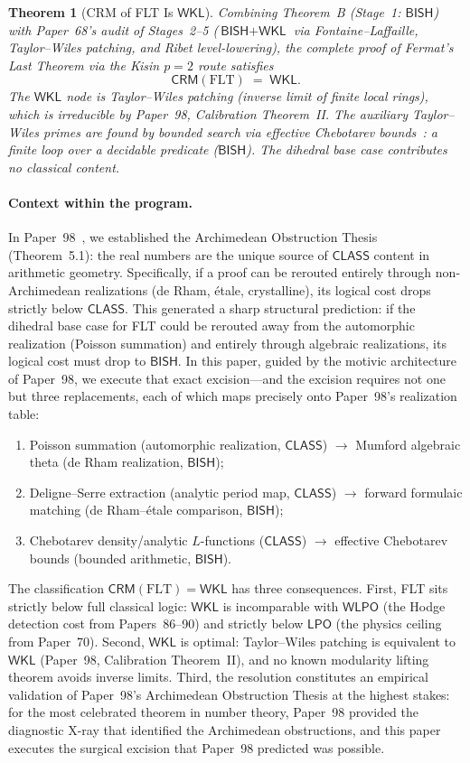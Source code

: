 \documentclass[11pt,a4paper]{article}
\theoremstyle{plain}
\newtheorem{theorem}{Theorem}[section]
\theoremstyle{definition}
\newcommand{\BISH}{\textsf{BISH}}
\newcommand{\WKL}{\textsf{WKL}}
\newcommand{\WLPO}{\textsf{WLPO}}
\newcommand{\LPO}{\textsf{LPO}}
\newcommand{\CLASS}{\textsf{CLASS}}
\newcommand{\CRM}{\textsf{CRM}}
\begin{document}
\begin{theorem}[CRM of FLT Is $\WKL$]\label{thm:C}
Combining Theorem~B (Stage~1: $\BISH$) with Paper~68's audit of Stages~2--5 ($\BISH + \WKL$ via Fontaine--Laffaille, Taylor--Wiles patching, and Ribet level-lowering), the complete proof of Fermat's Last Theorem via the Kisin $p = 2$ route satisfies
\[
\CRM(\mathrm{FLT}) \;=\; \WKL.
\]
The $\WKL$ node is Taylor--Wiles patching (inverse limit of finite local rings), which is irreducible by Paper~98, Calibration Theorem~II.
The auxiliary Taylor--Wiles primes are found by bounded search via effective Chebotarev bounds~\cite{lagarias-odlyzko77}: a finite loop over a decidable predicate ($\BISH$).
The dihedral base case contributes no classical content.
\end{theorem}

\paragraph{Context within the program.}
In Paper~98~\cite{lee-p98}, we established the Archimedean Obstruction Thesis (Theorem~5.1): the real numbers are the unique source of $\CLASS$ content in arithmetic geometry.
Specifically, if a proof can be rerouted entirely through non-Archimedean realizations (de Rham, \'etale, crystalline), its logical cost drops strictly below $\CLASS$.
This generated a sharp structural prediction: if the dihedral base case for FLT could be rerouted away from the automorphic realization (Poisson summation) and entirely through algebraic realizations, its logical cost must drop to $\BISH$.
In this paper, guided by the motivic architecture of Paper~98, we execute that exact excision---and the excision requires not one but three replacements, each of which maps precisely onto Paper~98's realization table:
\begin{enumerate}[label=(\roman*),leftmargin=2em,topsep=3pt]
\item Poisson summation (automorphic realization, $\CLASS$) $\to$ Mumford algebraic theta (de Rham realization, $\BISH$);
\item Deligne--Serre extraction (analytic period map, $\CLASS$) $\to$ forward formulaic matching (de Rham--\'etale comparison, $\BISH$);
\item Chebotarev density/analytic $L$-functions ($\CLASS$) $\to$ effective Chebotarev bounds (bounded arithmetic, $\BISH$).
\end{enumerate}
The classification $\CRM(\mathrm{FLT}) = \WKL$ has three consequences.
First, FLT sits strictly below full classical logic: $\WKL$ is incomparable with $\WLPO$ (the Hodge detection cost from Papers~86--90) and strictly below $\LPO$ (the physics ceiling from Paper~70).
Second, $\WKL$ is optimal: Taylor--Wiles patching is equivalent to $\WKL$ (Paper~98, Calibration Theorem~II), and no known modularity lifting theorem avoids inverse limits.
Third, the resolution constitutes an empirical validation of Paper~98's Archimedean Obstruction Thesis at the highest stakes: for the most celebrated theorem in number theory, Paper~98 provided the diagnostic X-ray that identified the Archimedean obstructions, and this paper executes the surgical excision that Paper~98 predicted was possible.
\end{document}
